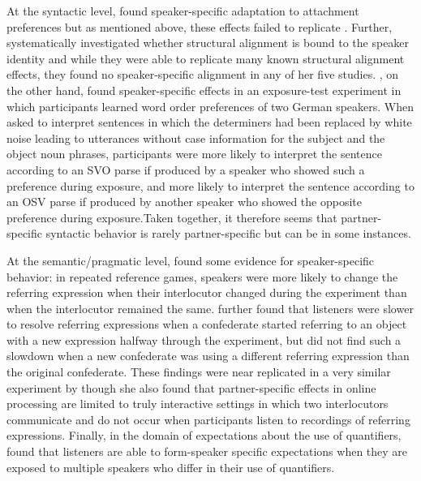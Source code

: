 At the syntactic level, \textcite{Kamide2012} found speaker-specific adaptation to attachment preferences but as mentioned above, these effects failed to replicate \cite{Liu2017}. Further, 
\textcite{Ostrand2019} systematically investigated whether structural alignment is bound to the speaker identity and while they were able to replicate many known structural 
alignment effects, they found no speaker-specific alignment in any of her five studies. \textcite{Kroczek2017}, on the other hand, found speaker-specific effects in an exposure-test experiment in which
participants learned word order preferences of two German speakers. When asked to interpret sentences in which the determiners had been replaced by white noise leading to utterances
without case information for the subject and the object noun phrases, participants were more likely to interpret the sentence according to an SVO parse if produced by a speaker who showed such a preference
during exposure, and more likely to interpret the sentence according to an OSV parse if produced by another speaker who showed the opposite preference during exposure.Taken together, it therefore seems that 
partner-specific syntactic behavior is rarely partner-specific but can be in some instances.

At the semantic/pragmatic level, \textcite{Brennan1996} found some evidence for speaker-specific behavior: in repeated reference games, speakers were more likely to 
change the referring expression when their interlocutor changed during the experiment than when the interlocutor remained the same. \textcite{Metzing2003} further
found that listeners were slower to resolve referring expressions when a confederate started referring to an object with a new expression halfway through the experiment, 
but did not find such a slowdown when a new confederate was using a different referring expression than the original confederate. These findings were near replicated 
in a very similar experiment by \textcite{BrownSchmidt2009} though she also found that partner-specific effects in online processing are limited to truly interactive settings in which
two interlocutors communicate and do not occur when participants listen to recordings of referring expressions. Finally, in the domain of expectations about the use of quantifiers,
\textcite{Yildirim2016} found that listeners are able to form-speaker specific expectations when they are exposed to multiple speakers who differ in their use of quantifiers. 

